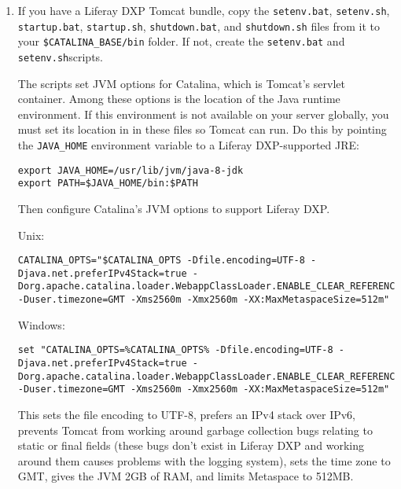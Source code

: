 \begin{enumerate}
\def\labelenumi{\arabic{enumi}.}
\item
  If you have a Liferay DXP Tomcat bundle, copy the \texttt{setenv.bat},
  \texttt{setenv.sh}, \texttt{startup.bat}, \texttt{startup.sh},
  \texttt{shutdown.bat}, and \texttt{shutdown.sh} files from it to your
  \texttt{\$CATALINA\_BASE/bin} folder. If not, create the
  \texttt{setenv.bat} and \texttt{setenv.sh}scripts.

  The scripts set JVM options for Catalina, which is Tomcat's servlet
  container. Among these options is the location of the Java runtime
  environment. If this environment is not available on your server
  globally, you must set its location in in these files so Tomcat can
  run. Do this by pointing the \texttt{JAVA\_HOME} environment variable
  to a Liferay DXP-supported JRE:

\begin{verbatim}
export JAVA_HOME=/usr/lib/jvm/java-8-jdk
export PATH=$JAVA_HOME/bin:$PATH
\end{verbatim}

  Then configure Catalina's JVM options to support Liferay DXP.

  Unix:

\begin{verbatim}
CATALINA_OPTS="$CATALINA_OPTS -Dfile.encoding=UTF-8 -Djava.net.preferIPv4Stack=true -Dorg.apache.catalina.loader.WebappClassLoader.ENABLE_CLEAR_REFERENCES=false -Duser.timezone=GMT -Xms2560m -Xmx2560m -XX:MaxMetaspaceSize=512m"
\end{verbatim}

  Windows:

\begin{verbatim}
set "CATALINA_OPTS=%CATALINA_OPTS% -Dfile.encoding=UTF-8 -Djava.net.preferIPv4Stack=true -Dorg.apache.catalina.loader.WebappClassLoader.ENABLE_CLEAR_REFERENCES=false -Duser.timezone=GMT -Xms2560m -Xmx2560m -XX:MaxMetaspaceSize=512m"
\end{verbatim}

  This sets the file encoding to UTF-8, prefers an IPv4 stack over IPv6,
  prevents Tomcat from working around garbage collection bugs relating
  to static or final fields (these bugs don't exist in Liferay DXP and
  working around them causes problems with the logging system), sets the
  time zone to GMT, gives the JVM 2GB of RAM, and limits Metaspace to
  512MB.
\end{enumerate}

\noindent\hrulefill

